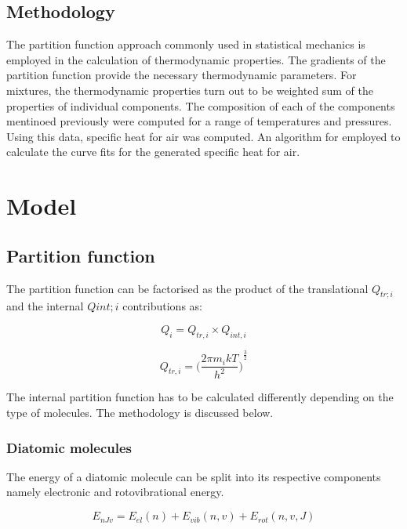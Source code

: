 \documentclass[]{aelab_aiaa-tc}%
\begin{document}
\subsection{Methodology}
The partition function approach commonly used in statistical mechanics is employed in the calculation of thermodynamic properties. The gradients of the partition function provide the necessary thermodynamic parameters. For mixtures, the thermodynamic properties turn out to be weighted sum of the properties of individual components. The composition of each of the components mentinoed previously were computed for a range of temperatures and pressures. Using this data, specific heat for air was computed. An algorithm for employed to calculate the curve fits for the generated specific heat for air.


\section{Model}

\subsection{Partition function}

The partition function can be factorised as the product of the
translational $Q_{tr;i}$ and the internal $Q{int;i}$ contributions as:

\begin{equation}
	\label{part:1}
	Q_i = Q_{tr,i} \times Q_{int,i} 
\end{equation}

\begin{equation}
	\label{part:2}
	Q_{tr,i} = { \bigg( \frac{2 \pi m_i k T  }{h^2} \bigg) } ^ \frac{3}{2}
\end{equation}

The internal partition function has to be calculated differently depending on the type of molecules. The methodology is discussed below.

\subsubsection{Diatomic molecules}

The energy of a diatomic molecule can be split into its respective components namely electronic and rotovibrational energy.

\begin{equation}
E_{nJv} = E_{el}(n) + E_{vib}(n,v) + E_{rot}(n,v,J)
\end{equation}
\end{document}
